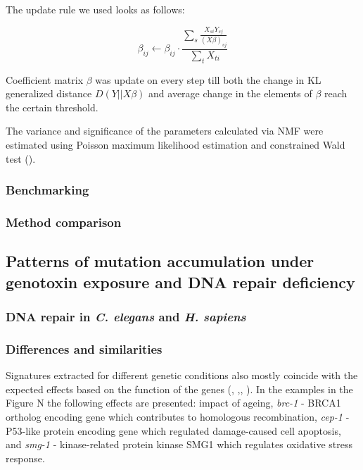 The update rule we used looks as follows:

\begin{equation}
\beta_{ij} \leftarrow \beta_{ij} \cdot \frac{\sum_s \frac{X_{si} Y_{sj}}{(X\beta)_{sj}}} {\sum_t X_{ti}}
\end{equation}

Coefficient matrix $\beta$ was update on every step till both the change in KL generalized distance \(D(Y||X\beta)\) and average change in the elements of $\beta$ reach the certain threshold. 

The variance and significance of the parameters calculated via NMF were estimated using Poisson maximum likelihood estimation and constrained Wald test (\cite{Wald}).


\subsubsection*{Benchmarking}



\subsubsection*{Method comparison}






\subsection{Patterns of mutation accumulation under genotoxin exposure and DNA repair deficiency}


\subsubsection{DNA repair in \textit{C. elegans} and \textit{H. sapiens}}

\subsubsection*{Differences and similarities}

Signatures extracted for different genetic conditions also mostly coincide with the expected effects based on the function of the genes (\cite{p53}, \cite{Meier1},\cite{DNArepair}, \cite{DNAdamagerepair}). In the examples in the Figure N the following effects are presented: impact of ageing, \textit{brc-1} - BRCA1 ortholog encoding gene which contributes to homologous recombination, \textit{cep-1} - P53-like protein encoding gene which regulated damage-caused cell apoptosis, and \textit{smg-1} - kinase-related protein kinase SMG1 which regulates oxidative stress response.

